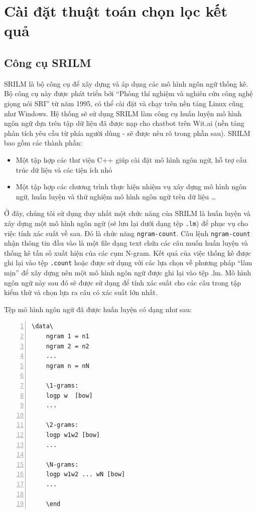 \documentclass[12pt]{report}
\begin{document}
\section{Cài đặt thuật toán chọn lọc kết quả}

\subsection{Công cụ SRILM}
SRILM là bộ công cụ để xây dựng và áp dụng các mô hình ngôn ngữ thống kê. Bộ công cụ này được phát triển bởi ``Phòng thí nghiệm và nghiên cứu công nghệ giọng nói SRI'' từ năm 1995, có thể cài đặt và chạy trên nền tảng Linux cũng như Windows.
Hệ thống sẽ sử dụng SRILM làm công cụ huấn luyện mô hình ngôn ngữ dựa trên tập dữ liệu đã được nạp cho chatbot trên Wit.ai (nền tảng phân tích yêu cầu từ phía người dùng - sẽ được nêu rõ trong phần sau). SRILM bao gồm các thành phần:

\begin{itemize}
	\item Một tập hợp các thư viện C++ giúp cài đặt mô hình ngôn ngữ, hỗ trợ cấu trúc dữ liệu và các tiện ích nhỏ
	\item Một tập hợp các chương trình thực hiện nhiệm vụ xây dựng mô hình ngôn ngữ, huấn luyện và thử nghiệm mô hình ngôn ngữ trên dữ liệu \ldots
\end{itemize}

Ở đây, chúng tôi sử dụng duy nhất một chức năng của SRILM là huấn luyện và xây dựng một mô hình ngôn ngữ (sẽ lưu lại dưới dạng tệp \texttt{.lm}) để phục vụ cho việc tính xác suất về sau. Đó là chức năng \texttt{ngram-count}. Câu lệnh \texttt{ngram-count} nhận thông tin đầu vào là một file dạng text chứa các câu muốn huấn luyện và thống kê tần số xuất hiện của các cụm N-gram. Kết quả của việc thống kê được ghi lại vào tệp \texttt{.count} hoặc được sử dụng với các lựa chọn về phương pháp ``làm mịn'' để xây dựng nên một mô hình ngôn ngữ được ghi lại vào tệp .lm. Mô hình ngôn ngữ này sau đó sẽ được sử dụng để tính xác suất cho các câu trong tập kiểm thử và chọn lựa ra câu có xác suất lớn nhất.

Tệp mô hình ngôn ngữ đã được huấn luyện có dạng như sau:
\begin{lstlisting}[frame=lines, basicstyle=\footnotesize\ttfamily, numbers=left, numberstyle=\tiny\color{black},caption= {Cấu trúc một mô hình ngôn ngữ}, backgroundcolor=\color{background}]
	\data\
	ngram 1 = n1
	ngram 2 = n2
	...
	ngram n = nN

	\1-grams:
	logp w  [bow]
	...

	\2-grams:
	logp w1w2 [bow]
	...

	\N-grams:
	logp w1w2 ... wN [bow]
	...

	\end
\end{lstlisting}
		
\end{document}
